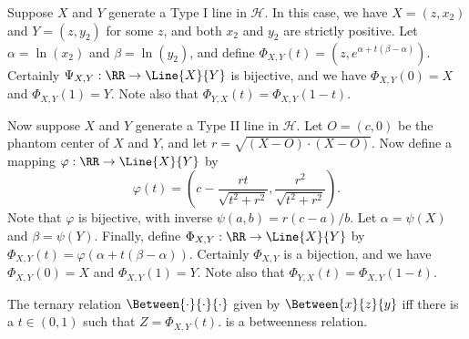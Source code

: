 Suppose \(X\) and \(Y\) generate a Type I line in \(\mathcal{H}\). In this case, we have \(X = (z,x_2)\) and \(Y = (z,y_2)\) for some \(z\), and both \(x_2\) and \(y_2\) are strictly positive. Let \(\alpha = \ln(x_2)\) and \(\beta = \ln(y_2)\), and define \(\Phi_{X,Y}(t) = (z, e^{\alpha + t(\beta - \alpha)})\). Certainly \(\Psi_{X,Y} : \RR \rightarrow \Line{X}{Y}\) is bijective, and we have \(\Phi_{X,Y}(0) = X\) and \(\Phi_{X,Y}(1) = Y\). Note also that \(\Phi_{Y,X}(t) = \Phi_{X,Y}(1-t)\).

Now suppose \(X\) and \(Y\) generate a Type II line in \(\mathcal{H}\). Let \(O = (c,0)\) be the phantom center of \(X\) and \(Y\), and let \(r = \sqrt{(X-O) \cdot (X-O)}\). Now define a mapping \(\varphi : \RR \rightarrow \Line{X}{Y}\) by \[ \varphi(t) = \left(c - \frac{rt}{\sqrt{t^2 + r^2}}, \frac{r^2}{\sqrt{t^2 + r^2}} \right).\] Note that \(\varphi\) is bijective, with inverse \(\psi(a,b) = r(c-a)/b\). Let \(\alpha = \psi(X)\) and \(\beta = \psi(Y)\). Finally, define \(\Phi_{X,Y} : \RR \rightarrow \Line{X}{Y}\) by \(\Phi_{X,Y}(t) = \varphi(\alpha + t(\beta - \alpha))\). Certainly \(\Phi_{X,Y}\) is a bijection, and we have \(\Phi_{X,Y}(0) = X\) and \(\Phi_{X,Y}(1) = Y\). Note also that \(\Phi_{Y,X}(t) = \Phi_{X,Y}(1-t)\).

\begin{prop}
The ternary relation \(\Between{\cdot}{\cdot}{\cdot}\) given by \(\Between{x}{z}{y}\) iff there is a \(t \in (0,1)\) such that \(Z = \Phi_{X,Y}(t)\). is a betweenness relation.
\end{prop}

